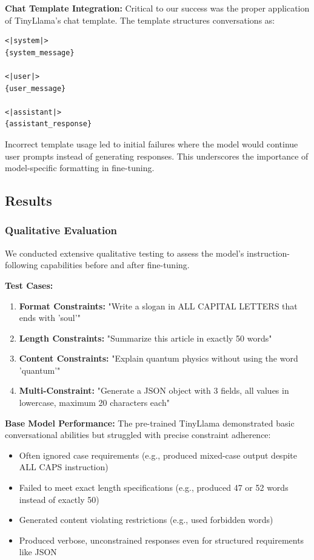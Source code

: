 \textbf{Chat Template Integration:}
Critical to our success was the proper application of TinyLlama's chat template. The template structures conversations as:
\begin{lstlisting}
<|system|>
{system_message}

<|user|>
{user_message}

<|assistant|>
{assistant_response}
\end{lstlisting}

Incorrect template usage led to initial failures where the model would continue user prompts instead of generating responses. This underscores the importance of model-specific formatting in fine-tuning.

\subsection{Results}

\subsubsection{Qualitative Evaluation}
We conducted extensive qualitative testing to assess the model's instruction-following capabilities before and after fine-tuning.

\textbf{Test Cases:}
\begin{enumerate}
    \item \textbf{Format Constraints:} "Write a slogan in ALL CAPITAL LETTERS that ends with 'soul'"
    \item \textbf{Length Constraints:} "Summarize this article in exactly 50 words"
    \item \textbf{Content Constraints:} "Explain quantum physics without using the word 'quantum'"
    \item \textbf{Multi-Constraint:} "Generate a JSON object with 3 fields, all values in lowercase, maximum 20 characters each"
\end{enumerate}

\textbf{Base Model Performance:}
The pre-trained TinyLlama demonstrated basic conversational abilities but struggled with precise constraint adherence:
\begin{itemize}
    \item Often ignored case requirements (e.g., produced mixed-case output despite ALL CAPS instruction)
    \item Failed to meet exact length specifications (e.g., produced 47 or 52 words instead of exactly 50)
    \item Generated content violating restrictions (e.g., used forbidden words)
    \item Produced verbose, unconstrained responses even for structured requirements like JSON
\end{itemize}

